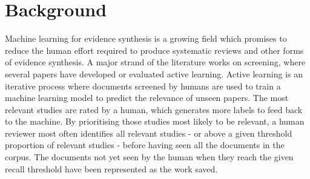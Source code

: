 \documentclass{bmcart}
\begin{document}
\begin{frontmatter}
\begin{abstractbox}
			\begin{keyword}
			\end{keyword}
			
			
		\end{abstractbox}
		
	\end{frontmatter}



	
	\section*{Background}
	
	Machine learning for evidence synthesis is a growing field which promises to reduce the human effort required to produce systematic reviews and other forms of evidence synthesis.
	A major strand of the literature works on screening,  
	where several papers have developed or evaluated active learning. 
	Active learning is an iterative process where documents screened by humans are used to train a machine learning model to predict the relevance of unseen papers.
	The most relevant studies are rated by a human, which generates more labels to feed back to the machine. 
	By prioritising those studies most likely to be relevant, a human reviewer most often identifies all relevant studies - or above a given threshold proportion of relevant studies - before having seen all the documents in the corpus. 
	The documents not yet seen by the human when they reach the given recall threshold have been represented as the work saved.
	
\end{document}
